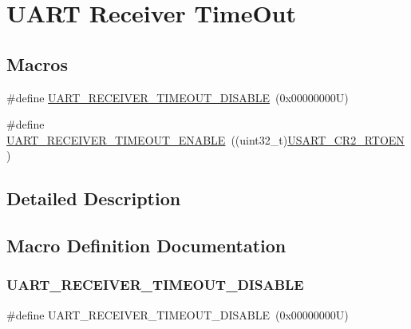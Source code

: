 \hypertarget{group___u_a_r_t___receiver___time_out}{}\section{U\+A\+RT Receiver Time\+Out}
\label{group___u_a_r_t___receiver___time_out}
\subsection*{Macros}
\begin{DoxyCompactItemize}
\item 
\#define \hyperlink{group___u_a_r_t___receiver___time_out_ga575c43813df656b21dc39aff6a968046}{U\+A\+R\+T\+\_\+\+R\+E\+C\+E\+I\+V\+E\+R\+\_\+\+T\+I\+M\+E\+O\+U\+T\+\_\+\+D\+I\+S\+A\+B\+LE}~(0x00000000\+U)
\item 
\#define \hyperlink{group___u_a_r_t___receiver___time_out_ga6e25985f0dacc3e79ae552746952ac18}{U\+A\+R\+T\+\_\+\+R\+E\+C\+E\+I\+V\+E\+R\+\_\+\+T\+I\+M\+E\+O\+U\+T\+\_\+\+E\+N\+A\+B\+LE}~((uint32\+\_\+t)\hyperlink{group___peripheral___registers___bits___definition_gab89524eda63950f55bc47208a66b7dca}{U\+S\+A\+R\+T\+\_\+\+C\+R2\+\_\+\+R\+T\+O\+EN})
\end{DoxyCompactItemize}


\subsection{Detailed Description}


\subsection{Macro Definition Documentation}
\mbox{\label{group___u_a_r_t___receiver___time_out_ga575c43813df656b21dc39aff6a968046}} 
\subsubsection{\texorpdfstring{U\+A\+R\+T\+\_\+\+R\+E\+C\+E\+I\+V\+E\+R\+\_\+\+T\+I\+M\+E\+O\+U\+T\+\_\+\+D\+I\+S\+A\+B\+LE}{UART\_RECEIVER\_TIMEOUT\_DISABLE}}
{\footnotesize\ttfamily \#define U\+A\+R\+T\+\_\+\+R\+E\+C\+E\+I\+V\+E\+R\+\_\+\+T\+I\+M\+E\+O\+U\+T\+\_\+\+D\+I\+S\+A\+B\+LE~(0x00000000\+U)}

